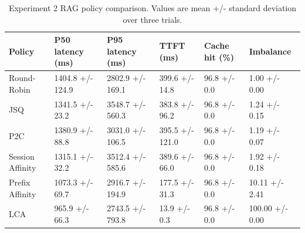 \begin{table}
\caption{Experiment 2 RAG policy comparison. Values are mean +/- standard deviation over three trials.}
\label{tab:exp2-policy-summary}
\begin{tabular}{llllll}
\toprule
Policy & P50 latency (ms) & P95 latency (ms) & TTFT (ms) & Cache hit (\%) & Imbalance \\
\midrule
Round-Robin & 1404.8 +/- 124.9 & 2802.9 +/- 169.1 & 399.6 +/- 14.8 & 96.8 +/- 0.0 & 1.00 +/- 0.00 \\
JSQ & 1341.5 +/- 23.2 & 3548.7 +/- 560.3 & 383.8 +/- 96.2 & 96.8 +/- 0.0 & 1.24 +/- 0.15 \\
P2C & 1380.9 +/- 88.8 & 3031.0 +/- 106.5 & 395.5 +/- 121.0 & 96.8 +/- 0.0 & 1.19 +/- 0.07 \\
Session Affinity & 1315.1 +/- 32.2 & 3512.4 +/- 585.6 & 389.6 +/- 66.0 & 96.8 +/- 0.0 & 1.92 +/- 0.18 \\
Prefix Affinity & 1073.3 +/- 69.7 & 2916.7 +/- 194.9 & 177.5 +/- 31.3 & 96.8 +/- 0.0 & 10.11 +/- 2.41 \\
LCA & 965.9 +/- 66.3 & 2743.5 +/- 793.8 & 13.9 +/- 0.3 & 96.8 +/- 0.0 & 100.00 +/- 0.00 \\
\bottomrule
\end{tabular}
\end{table}

